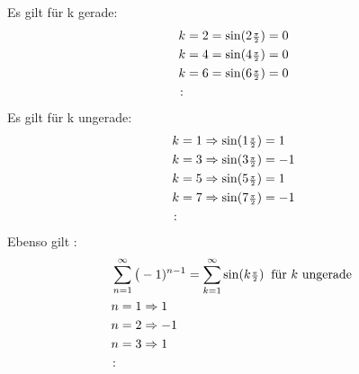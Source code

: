 Es gilt für k gerade:\\
\begin{align*}
&k=2=\sin(2\genfrac{}{}{}{2}{\pi }{2 })=0\\
&k=4=\sin(4\genfrac{}{}{}{2}{\pi }{2 })=0\\
&k=6=\sin(6\genfrac{}{}{}{2}{\pi }{2 })=0\\
&\colon
\end{align*}
Es gilt für k ungerade:\\
\begin{align*}
&k=1\Rightarrow\sin(1\genfrac{}{}{}{2}{\pi }{2 })=1\\
&k=3\Rightarrow\sin(3\genfrac{}{}{}{2}{\pi }{2 })=-1\\
&k=5\Rightarrow\sin(5\genfrac{}{}{}{2}{\pi }{2 })=1\\
&k=7\Rightarrow\sin(7\genfrac{}{}{}{2}{\pi }{2 })=-1\\
&\colon
\end{align*}
Ebenso gilt :\\
\begin{align*}
&\sum\limits_{n=1}^{\infty}\big(-1)^{n-1}=\sum\limits_{k=1}^{\infty}\sin(k\genfrac{}{}{}{2}{\pi }{2 })\;\;\text{für $ k $ ungerade } \\
&n=1\Rightarrow 1\\
&n=2\Rightarrow -1\\
&n=3\Rightarrow 1\\
&\colon
\end{align*}

